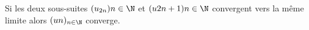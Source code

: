 Si les deux sous-suites $(u_{2n}){n\in\N}$ et $(u{2n+1}){n\in\N}$ convergent vers la même limite alors $(u{n})_{n\in\N}$ converge.

\begin{reponses}
\end{reponses}

